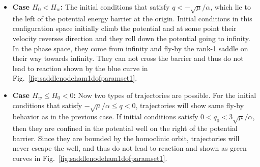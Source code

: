 \documentclass{ws-ijbc}
\begin{document}
\begin{itemize}
	\item \textbf{Case $H_0 < H_w$:} The initial conditions that satisfy $q < -\sqrt{\mu}/\alpha$, which lie to the left of the potential energy barrier at the origin. Initial conditions in this configuration space initially climb the potential and at some point their velocity reverses direction and they roll down the potential going to infinity. In the phase space, they come from infinity and fly-by the rank-1 saddle on their way towards infinity. They can not cross the barrier and thus do not lead to reaction shown by the blue curve in Fig.~\ref{fig:saddlenodeham1dofparamset1}.
	
	\item \textbf{Case $H_w \leq H_0 < 0$:} Now two types of trajectories are possible. For the initial conditions that satisfy $-\sqrt{\mu}/\alpha \leq q < 0$, trajectories will show same fly-by behavior as in the previous case. If initial conditions satisfy $0 < q_0 < 3 \sqrt{\mu}/\alpha$, then they are confined in the potential well on the right of the potential barrier. Since they are bounded by the homoclinic orbit, trajectories will never escape the well, and thus do not lead to reaction and shown as green curves in Fig.~\ref{fig:saddlenodeham1dofparamset1}. 
	

\end{itemize}
\end{document}
